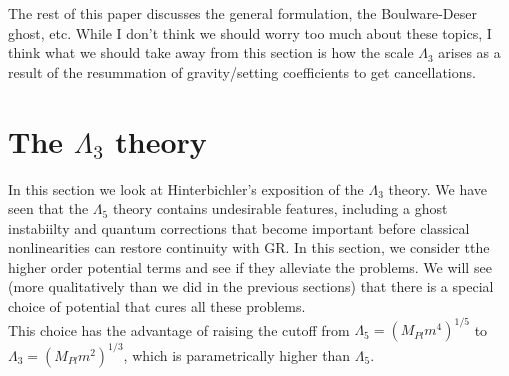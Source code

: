 \documentclass{book}
\theoremstyle{definition}
\newcommand{\lag}{\mathcal{L}}
\newcommand{\f}[2]{\frac{#1}{#2}}
\begin{document}
The rest of this paper discusses the general formulation, the Boulware-Deser ghost, etc. While I don't think we should worry too much about these topics, I think what we should take away from this section is how the scale $\Lambda_3$ arises as a result of the resummation of gravity/setting coefficients to get cancellations. 



%
%
%











\newpage




\section{The $\Lambda_3$ theory}



In this section we look at Hinterbichler's exposition of the $\Lambda_3$ theory. We have seen that the $\Lambda_5$ theory contains undesirable features, including a ghost instabiilty and quantum corrections that become important before classical nonlinearities can restore continuity with GR. In this section, we consider tthe higher order potential terms and see if they alleviate the problems. We will see (more qualitatively than we did in the previous sections) that there is a special choice of potential that cures all these problems.\\

This choice has the advantage of raising the cutoff from $\Lambda_5 = (M_{Pl}m^4)^{1/5}$ to $\Lambda_3 = (M_{Pl}m^2)^{1/3}$, which is parametrically higher than $\Lambda_5$.    
\end{document}
